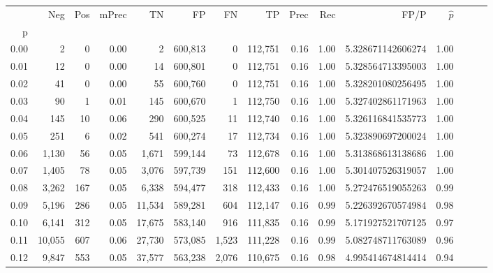\begin{tabular}{rrrrrrrrrrrrrrr}
\toprule
{} &     Neg &    Pos & mPrec &       TN &       FP &       FN &       TP &  Prec &   Rec &                    FP/P & $\hat{p}$ \\
p    &         &        &       &          &          &          &          &       &       &                         &           \\
\midrule
0.00 &       2 &      0 &  0.00 &        2 &  600,813 &        0 &  112,751 &  0.16 &  1.00 &       5.328671142606274 &      1.00 \\
0.01 &      12 &      0 &  0.00 &       14 &  600,801 &        0 &  112,751 &  0.16 &  1.00 &       5.328564713395003 &      1.00 \\
0.02 &      41 &      0 &  0.00 &       55 &  600,760 &        0 &  112,751 &  0.16 &  1.00 &       5.328201080256495 &      1.00 \\
0.03 &      90 &      1 &  0.01 &      145 &  600,670 &        1 &  112,750 &  0.16 &  1.00 &       5.327402861171963 &      1.00 \\
0.04 &     145 &     10 &  0.06 &      290 &  600,525 &       11 &  112,740 &  0.16 &  1.00 &       5.326116841535773 &      1.00 \\
0.05 &     251 &      6 &  0.02 &      541 &  600,274 &       17 &  112,734 &  0.16 &  1.00 &       5.323890697200024 &      1.00 \\
0.06 &   1,130 &     56 &  0.05 &    1,671 &  599,144 &       73 &  112,678 &  0.16 &  1.00 &       5.313868613138686 &      1.00 \\
0.07 &   1,405 &     78 &  0.05 &    3,076 &  597,739 &      151 &  112,600 &  0.16 &  1.00 &       5.301407526319057 &      1.00 \\
0.08 &   3,262 &    167 &  0.05 &    6,338 &  594,477 &      318 &  112,433 &  0.16 &  1.00 &       5.272476519055263 &      0.99 \\
0.09 &   5,196 &    286 &  0.05 &   11,534 &  589,281 &      604 &  112,147 &  0.16 &  0.99 &       5.226392670574984 &      0.98 \\
0.10 &   6,141 &    312 &  0.05 &   17,675 &  583,140 &      916 &  111,835 &  0.16 &  0.99 &       5.171927521707125 &      0.97 \\
0.11 &  10,055 &    607 &  0.06 &   27,730 &  573,085 &    1,523 &  111,228 &  0.16 &  0.99 &       5.082748711763089 &      0.96 \\
0.12 &   9,847 &    553 &  0.05 &   37,577 &  563,238 &    2,076 &  110,675 &  0.16 &  0.98 &       4.995414674814414 &      0.94 \\

\end{tabular}
